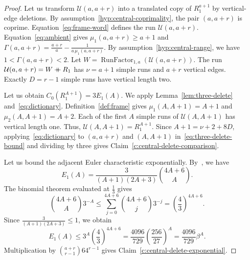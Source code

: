 \begin{proof}
 Let us transform $\mathcal U(a,a+r)$ into a translated copy of $R_1^{a+1}$ by vertical-edge deletions.
By assumption~\ref{hyp:central-coprimality}, the pair $(a,a+r)$
is coprime. Equation~\eqref{eq:frame-word} defines the run $\mathcal{U}(a,a+r)$.
Equation~\eqref{eq:ambient} gives $\mu_1(a,a+r)\ge a+1$ and
$\Gamma(a,a+r)=\frac{a+r}{a}-\frac{1}{a\,\mu_1(a,a+r)}$.
By assumption~\ref{hyp:central-range}, we have $1<\Gamma(a,a+r)<2$.
Let $W=\operatorname{RunFactor}_{1,a}(\mathcal U(a,a+r))$.
The run $\mathcal{U}(a,a+r)=W\mathbin{+\mkern-10mu+} R_1$ has $\nu=a+1$ simple runs
and $a+r$ vertical edges. Exactly $D=r-1$ simple runs have vertical length two.

Let us obtain $C_0(R_1^{A+1})=3E_1(A)$.
We apply Lemma~\ref{lem:three-delete} and~\eqref{eq:dictionary}.
Definition~\ref{def:frame} gives $\mu_1(A,A+1)=A+1$ and $\mu_2(A,A+1)=A+2$. Each of the first $A$ simple runs of $\mathcal{U}(A,A+1)$ has vertical length one. Thus, $\mathcal{U}(A,A+1)=R_1^{A+1}$. Since $A+1=\nu+2+8D$, applying~\eqref{eq:dictionary} to $(a,a+r)$ and $(A,A+1)$ in~\eqref{eq:three-delete-bound} and dividing by three gives Claim~\ref{c:central-delete-comparison}.

 Let us bound the adjacent Euler characteristic exponentially.
By~\cite[Theorem 6.6]{Weist}, we have
\begin{equation}\label{eq:adjacent-three}
 E_1(A)=\frac{3}{(A+1)(2A+3)}\binom{4A+6}{A}.
\end{equation}
The binomial theorem evaluated at $\frac13$ gives
\[
 \binom{4A+6}{A}3^{-A}
 \le\sum_{j=0}^{4A+6}\binom{4A+6}{j}3^{-j}
 =\left(\frac43\right)^{4A+6}.
\]
Since $\frac{3}{(A+1)(2A+3)}\le1$, we obtain
\[
 E_1(A)\le3^A\left(\frac43\right)^{4A+6}
 =\frac{4096}{729}\left(\frac{256}{27}\right)^A
 =\frac{4096}{729}\beta^A.
\]
Multiplication by $\binom{a+r}{r-1}64^{r-1}$ gives Claim~\ref{c:central-delete-exponential}.
\end{proof}

